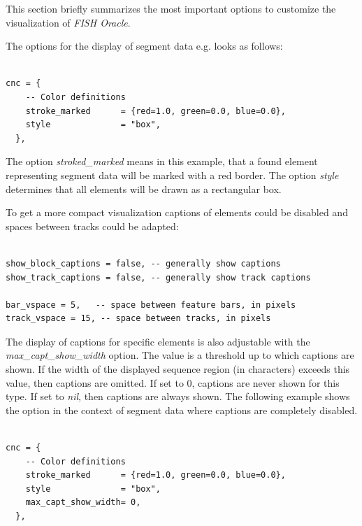 \documentclass[11pt,final]{article}
\newcommand{\FO}[0]{\emph{FISH Oracle}\xspace}
\begin{document}
This section briefly summarizes the most important options to customize the
visualization of \FO.

The options for the display of segment data e.g. looks as follows:
\begin{verbatim}

cnc = {
    -- Color definitions
    stroke_marked      = {red=1.0, green=0.0, blue=0.0},
    style              = "box",
  },

\end{verbatim}

The option \textit{stroked\_marked} means in this example, that a found element
representing segment data will be marked with a red border. The option
\textit{style} determines that all elements will be drawn as a rectangular
box.

To get a more compact visualization captions of elements could be disabled
and spaces between tracks could be adapted:

\begin{verbatim}

show_block_captions = false, -- generally show captions
show_track_captions = false, -- generally show track captions

bar_vspace = 5,   -- space between feature bars, in pixels
track_vspace = 15, -- space between tracks, in pixels

\end{verbatim}

The display of captions for specific elements is also adjustable with the
\textit{max\_capt\_show\_width} option. The value is a threshold up to which
captions are shown. If the width of the displayed sequence region
(in characters) exceeds this value, then captions are omitted. If set to 0,
captions are never shown for this type. If set to \textit{nil}, then captions are
always shown.
The following example shows the option in the context of segment data where
captions are completely disabled.

\begin{verbatim}

cnc = {
    -- Color definitions
    stroke_marked      = {red=1.0, green=0.0, blue=0.0},
    style              = "box",
    max_capt_show_width= 0,
  },


\end{verbatim}

\end{document}
